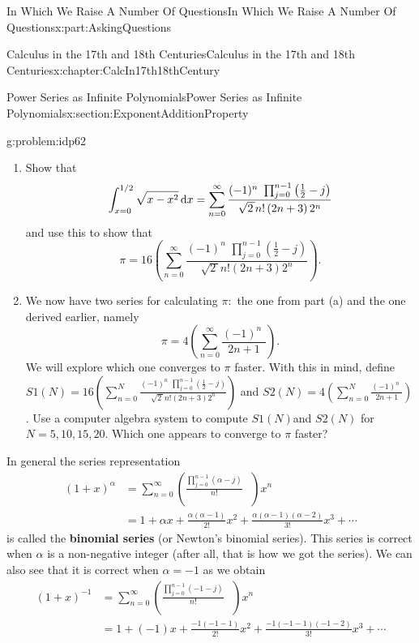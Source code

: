 \documentclass[oneside,10pt,]{book}
\newcommand{\terminology}[1]{\textbf{#1}}
\numberwithin{equation}{section}
\newcommand{\dx}[1]{\,{\rm d}#1}
\newcommand{\amp}{&}
\begin{document}
\begin{partptx}{In Which We Raise A Number Of Questions}{}{In Which We Raise A Number Of Questions}{}{}{x:part:AskingQuestions}
\begin{chapterptx}{Calculus in the 17th and 18th Centuries}{}{Calculus in the 17th and 18th Centuries}{}{}{x:chapter:CalcIn17th18thCentury}
\begin{sectionptx}{Power Series as Infinite Polynomials}{}{Power Series as Infinite Polynomials}{}{}{x:section:ExponentAdditionProperty}
\begin{problem}{}{g:problem:idp62}
%
\begin{enumerate}[label=(\alph*)]
\item{}Show that%
\begin{equation*}
\int_{x=0}^{1/2}\sqrt{x-x^2}\dx{ x}=\sum_{n=0}^\infty\frac{(-1)^n\,\,\prod_{j=0}^{n-1}\left(\frac{1}{2}-j\right)}{\sqrt{2\,}n!\left(2n+3\right)2^n}
\end{equation*}
and use this to show that%
\begin{equation*}
\pi=16\left(\sum_{n=0}^\infty\frac{(-1)^n\,\,\prod_{j=0}^{n-1}\left(\frac{1}{2}-j\right)}{\sqrt{2\,}n!\left(2n+3\right)2^n}\right)\text{.}
\end{equation*}
%
\item{}We now have two series for calculating \(\pi:\)  the one from part (a) and the one derived earlier, namely%
\begin{equation*}
\pi=4\left(\sum_{n=0}^\infty\frac{(-1)^n\,\,}{2n+1}\right)\text{.}
\end{equation*}
We will explore which one converges to \(\pi\) faster. With this in mind, define \(S1(N)=16\left(\sum_{n=0}^N\frac{(-1)^n\,\,\prod_{j=0}^{n-1}\left( \frac{1}{2}-j\right)}{\sqrt{2\,}n!\left(2n+3\right)2^n}\right)\) and \(S2(N)=4\left(\sum_{n=0}^N\frac{(-1)^n\,\,}{2n+1}\right)\). Use a computer algebra system to compute \(S1(N)\)and \(S2(N)\) for \(N=5,10,15,20\). Which one appears to converge to \(\pi\) faster?%
\end{enumerate}
%
\end{problem}
In general the series representation%
\begin{align*}
\left(1+x\right)^\alpha \amp  =\sum_{n=0}^\infty\left(\frac{\prod_{j=0}^{n-1}\left(\alpha-j\right)}{n!}\text{ } \right)x^n\\
\amp =1+\alpha x+\frac{\alpha\left(\alpha-1\right)}{2!}x^2+\frac{\alpha\left(\alpha-1\right)\left(\alpha-2\right)}{3!}x^3+\cdots
\end{align*}
is called the \terminology{binomial series} (or Newton's binomial series). This series is correct when \(\alpha\) is a non-negative integer (after all, that is how we got the series). We can also see that it is correct when \(\alpha=-1\) as we obtain%
\begin{align*}
\left(1+x\right)^{-1}\amp =\sum_{n=0}^\infty\left(\frac{\prod_{j=0}^{n-1}\left(-1-j\right)}{n!}\text{ } \right)x^n\\
\amp =1+(-1)x+\frac{-1\left(-1-1\right)}{2!}x^2+\frac{-1\left(-1-1\right)\left(-1-2\right)}{3!}x^3+\cdots\\

\end{align*}
\end{sectionptx}
\end{chapterptx}
\end{partptx}
\end{document}
